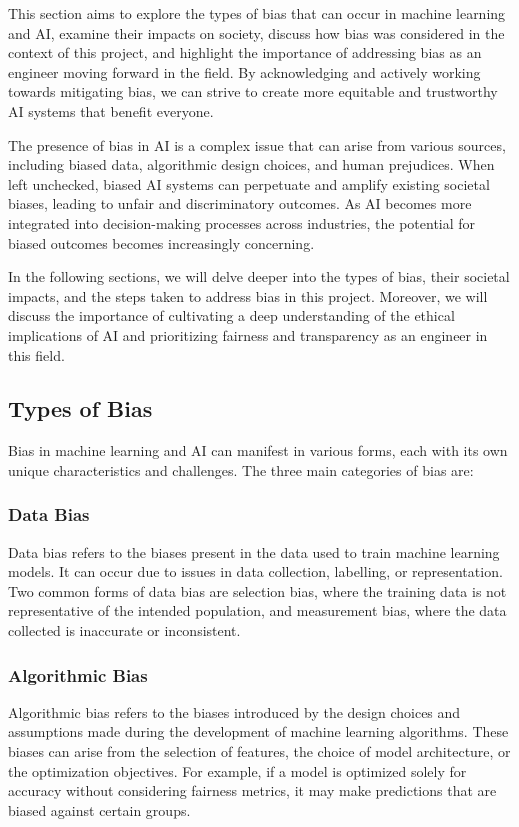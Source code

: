 \documentclass[letterpaper,10pt]{article}
\begin{document}
This section aims to explore the types of bias that can occur in machine learning and AI, examine their impacts on society, discuss how bias was considered in the context of this project, and highlight the importance of addressing bias as an engineer moving forward in the field. By acknowledging and actively working towards mitigating bias, we can strive to create more equitable and trustworthy AI systems that benefit everyone. \par

The presence of bias in AI is a complex issue that can arise from various sources, including biased data, algorithmic design choices, and human prejudices. When left unchecked, biased AI systems can perpetuate and amplify existing societal biases, leading to unfair and discriminatory outcomes. As AI becomes more integrated into decision-making processes across industries, the potential for biased outcomes becomes increasingly concerning. \par

In the following sections, we will delve deeper into the types of bias, their societal impacts, and the steps taken to address bias in this project. Moreover, we will discuss the importance of cultivating a deep understanding of the ethical implications of AI and prioritizing fairness and transparency as an engineer in this field. \par

\subsection{Types of Bias}
Bias in machine learning and AI can manifest in various forms, each with its own unique characteristics and challenges. The three main categories of bias are:
\subsubsection{Data Bias
}Data bias refers to the biases present in the data used to train machine learning models. It can occur due to issues in data collection, labelling, or representation. Two common forms of data bias are selection bias, where the training data is not representative of the intended population, and measurement bias, where the data collected is inaccurate or inconsistent.

\subsubsection{Algorithmic Bias
}Algorithmic bias refers to the biases introduced by the design choices and assumptions made during the development of machine learning algorithms. These biases can arise from the selection of features, the choice of model architecture, or the optimization objectives. For example, if a model is optimized solely for accuracy without considering fairness metrics, it may make predictions that are biased against certain groups.
\end{document}
